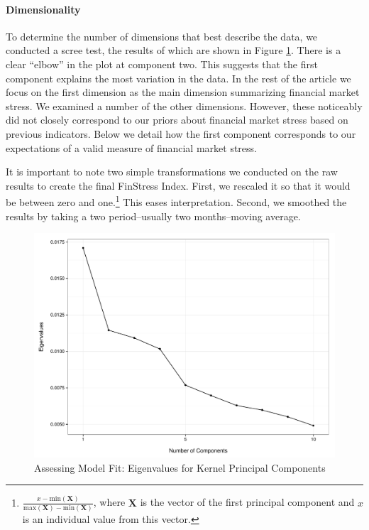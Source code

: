 \documentclass[]{article}
\begin{document}
\paragraph{Dimensionality}\label{dimensionality}

To determine the number of dimensions that best describe the data, we conducted a scree test, the results of which are shown in Figure \ref{scree_plot}. There is a clear ``elbow'' in the plot at component two. This suggests that the first component explains the most variation in the data. In the rest of the article we focus on the first dimension as the main dimension summarizing financial market stress. We examined a number of the other dimensions. However, these noticeably did not closely correspond to our priors about financial market stress based on previous indicators. Below we detail how the first component corresponds to our expectations of a valid measure of financial market stress.

It is important to note two simple transformations we conducted on the raw results to create the final FinStress Index. First, we rescaled it so that it would be between zero and one.\footnote{\(\frac{x - \mathrm{min}(\bm{X})}{\mathrm{max}(\bm{X}) - \mathrm{min}(\bm{X})}\),
  where \(\bm{X}\) is the vector of the first principal component and
  \(x\) is an individual value from this vector.} This eases
interpretation. Second, we smoothed the results by taking a two period--usually two months--moving average.

\begin{figure}
    \caption{Assessing Model Fit: Eigenvalues for Kernel Principal Components}
    \label{scree_plot}
    \begin{center}
        \includegraphics[scale=0.5]{figures/scree_plot.pdf}
    \end{center}
\end{figure}
\end{document}
